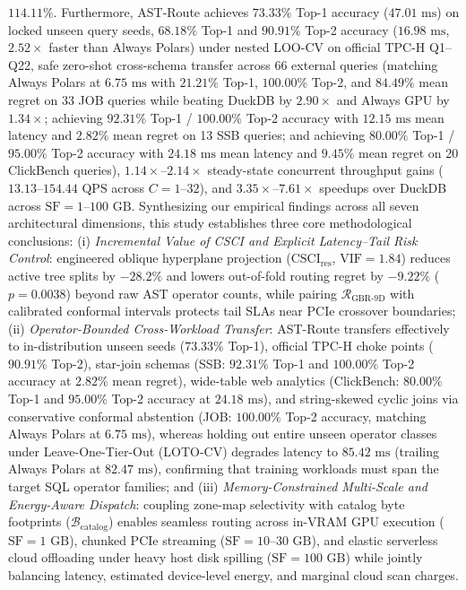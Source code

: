 \documentclass[10pt,a4paper]{article}
\begin{document}
$114.11\%$. Furthermore, AST-Route achieves $73.33\%$ Top-1 accuracy ($47.01\text{ ms}$) on locked unseen query seeds, $68.18\%$ Top-1 and $90.91\%$ Top-2 accuracy ($16.98\text{ ms}$, $2.52\times$ faster than Always Polars) under nested LOO-CV on official TPC-H Q1--Q22, safe zero-shot cross-schema transfer across 66 external queries (matching Always Polars at $6.75\text{ ms}$ with $21.21\%$ Top-1, $100.00\%$ Top-2, and $84.49\%$ mean regret on 33 JOB queries while beating DuckDB by $2.90\times$ and Always GPU by $1.34\times$; achieving $92.31\%$ Top-1 / $100.00\%$ Top-2 accuracy with $12.15\text{ ms}$ mean latency and $2.82\%$ mean regret on 13 SSB queries; and achieving $80.00\%$ Top-1 / $95.00\%$ Top-2 accuracy with $24.18\text{ ms}$ mean latency and $9.45\%$ mean regret on 20 ClickBench queries), $1.14\times\text{--}2.14\times$ steady-state concurrent throughput gains ($13.13\text{--}154.44\text{ QPS}$ across $C=1\text{--}32$), and $3.35\times\text{--}7.61\times$ speedups over DuckDB across $\text{SF}=1\text{--}100\text{ GB}$. Synthesizing our empirical findings across all seven architectural dimensions, this study establishes three core methodological conclusions: (i) \textit{Incremental Value of CSCI and Explicit Latency--Tail Risk Control}: engineered oblique hyperplane projection ($\text{CSCI}_{\text{res}}$, $\text{VIF}=1.84$) reduces active tree splits by $-28.2\%$ and lowers out-of-fold routing regret by $-9.22\%$ ($p=0.0038$) beyond raw AST operator counts, while pairing $\mathcal{R}_{\text{GBR-9D}}$ with calibrated conformal intervals protects tail SLAs near PCIe crossover boundaries; (ii) \textit{Operator-Bounded Cross-Workload Transfer}: AST-Route transfers effectively to in-distribution unseen seeds ($73.33\%$ Top-1), official TPC-H choke points ($90.91\%$ Top-2), star-join schemas (SSB: $92.31\%$ Top-1 and $100.00\%$ Top-2 accuracy at $2.82\%$ mean regret), wide-table web analytics (ClickBench: $80.00\%$ Top-1 and $95.00\%$ Top-2 accuracy at $24.18\text{ ms}$), and string-skewed cyclic joins via conservative conformal abstention (JOB: $100.00\%$ Top-2 accuracy, matching Always Polars at $6.75\text{ ms}$), whereas holding out entire unseen operator classes under Leave-One-Tier-Out (LOTO-CV) degrades latency to $85.42\text{ ms}$ (trailing Always Polars at $82.47\text{ ms}$), confirming that training workloads must span the target SQL operator families; and (iii) \textit{Memory-Constrained Multi-Scale and Energy-Aware Dispatch}: coupling zone-map selectivity with catalog byte footprints ($\mathcal{B}_{\text{catalog}}$) enables seamless routing across in-VRAM GPU execution ($\text{SF}=1\text{ GB}$), chunked PCIe streaming ($\text{SF}=10\text{--}30\text{ GB}$), and elastic serverless cloud offloading under heavy host disk spilling ($\text{SF}=100\text{ GB}$) while jointly balancing latency, estimated device-level energy, and marginal cloud scan charges.
\end{document}

